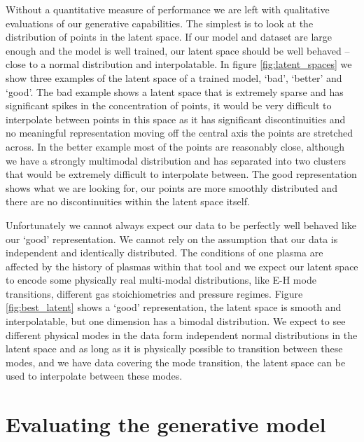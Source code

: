\documentclass[10pt]{iopart}
\begin{document}
Without a quantitative measure of performance we are left with qualitative evaluations of our generative capabilities. The simplest is to look at the distribution of points in the latent space. If our model and dataset are large enough and the model is well trained, our latent space should be well behaved -- close to a normal distribution and interpolatable. In figure \ref{fig:latent_spaces} we show three examples of the latent space of a trained model, `bad', `better' and `good'. The bad example shows a latent space that is extremely sparse and has significant spikes in the concentration of points, it would be very difficult to interpolate between points in this space as it has significant discontinuities and no meaningful representation moving off the central axis the points are stretched across. In the better example most of the points are reasonably close, although we have a strongly multimodal distribution and has separated into two clusters that would be extremely difficult to interpolate between. The good representation shows what we are looking for, our points are more smoothly distributed and there are no discontinuities within the latent space itself.

Unfortunately we cannot always expect our data to be perfectly well behaved like our `good' representation. We cannot rely on the assumption that our data is independent and identically distributed. The conditions of one plasma are affected by the history of plasmas within that tool and we expect our latent space to encode some physically real multi-modal distributions, like E-H mode transitions, different gas stoichiometries and pressure regimes. Figure \ref{fig:best_latent} shows a `good' representation, the latent space is smooth and interpolatable, but one dimension has a bimodal distribution. We expect to see different physical modes in the data form independent normal distributions in the latent space and as long as it is physically possible to transition between these modes, and we have data covering the mode transition, the latent space can be used to interpolate between these modes.

\section{Evaluating the generative model}\label{geneval}
\end{document}
